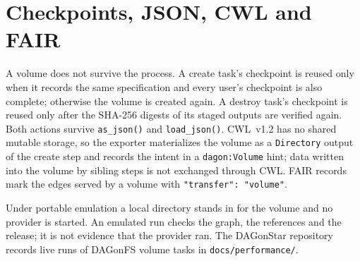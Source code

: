 \section{Checkpoints, JSON, CWL and FAIR}

A volume does not survive the process. A create task's checkpoint is reused
only when it records the same specification and every user's checkpoint is
also complete; otherwise the volume is created again. A destroy task's
checkpoint is reused only after the SHA-256 digests of its staged outputs are
verified again. Both actions survive \texttt{as\_json()} and
\texttt{load\_json()}. CWL~v1.2 has no shared mutable storage, so the exporter
materializes the volume as a \texttt{Directory} output of the create step and
records the intent in a \texttt{dagon:Volume} hint; data written into the
volume by sibling steps is not exchanged through CWL. FAIR records mark the
edges served by a volume with \texttt{"transfer": "volume"}.

\begin{practicebox}
Under portable emulation a local directory stands in for the volume and no
provider is started. An emulated run checks the graph, the references and the
release; it is not evidence that the provider ran. The DAGonStar repository
records live runs of DAGonFS volume tasks in
\texttt{docs/performance/}.
\end{practicebox}
